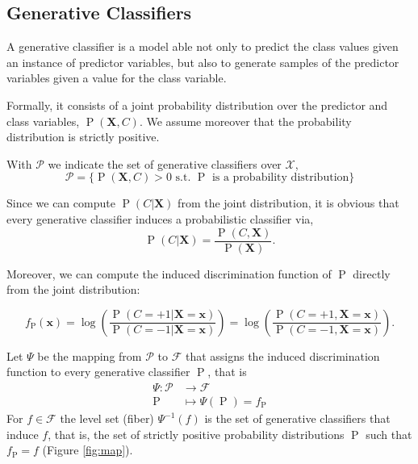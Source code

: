\documentclass[11pt,a4paper, twoside]{book}
\newcommand{\Pp}{\operatorname{P}}
\newcommand{\bx}{\mathbf{x}}
\newcommand{\bX}{\mathbf{X}}
\newcommand{\bchi}{\boldsymbol{\mathcal{X}}}
\begin{document}
\subsection{Generative Classifiers}
\label{sec:generativeclassifier}


A generative classifier is a model able not only to predict the class values given an instance of predictor variables, but also to generate samples of the predictor variables given a value for the class variable.

Formally, it consists of a joint probability distribution over the predictor and class variables, $\Pp(\bX, C)$. We assume moreover that the probability distribution is strictly positive.

With $\mathcal{P}$ we indicate the set of generative classifiers over $\bchi$,
$$ \mathcal{P} = \{ \Pp(\bX, C)> 0 \text{ s.t. } \Pp \text{ is a probability distribution} \}
$$

Since we can compute $\Pp(C|\bX)$ from the joint distribution, it is obvious that every generative classifier induces a probabilistic classifier via,
$$ \Pp(C|\bX) = \frac{\Pp(C, \bX)}{\Pp(\bX)} .$$

Moreover, we can compute the induced discrimination function of $\Pp$ directly from the joint distribution:

$$ f_{\Pp}(\bx) = \log\left( \frac{\Pp(C=+1 | \bX = \bx)}{\Pp(C=-1 | \bX = \bx)} \right) =  \log\left( \frac{\Pp(C=+1 , \bX = \bx)}{\Pp(C=-1 , \bX = \bx)} \right). $$ 

Let $\Psi$ be the mapping from $\mathcal{P}$ to $\mathcal{F}$ that assigns the induced discrimination function to every generative classifier $\Pp$, that is 
\begin{align*}
\Psi: \mathcal{P} & \to  \mathcal{F} \\ 
           \Pp   &    \mapsto \Psi(\Pp) = f_{\Pp}         
\end{align*}
For $f \in \mathcal{F}$ the level set (fiber) $\Psi^{-1}(f)$ is the set of generative classifiers that induce $f$, that is, the set of strictly positive probability distributions $\Pp$ such that $f_{\Pp}=f$ (Figure \ref{fig:map}).
\end{document}
